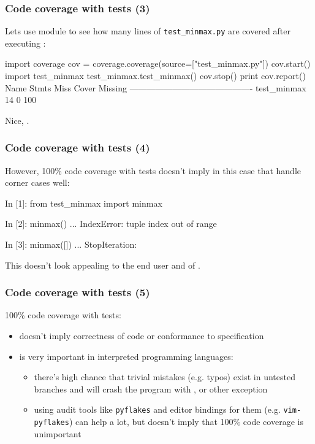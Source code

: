 \documentclass{beamer}
\begin{document}
\begin{frame}[fragile]
    \frametitle{Code coverage with tests (3)}

    Lets use  module to see how many lines of
    \verb+test_minmax.py+ are covered after executing :
    \begin{python}
import coverage
cov = coverage.coverage(source=["test_minmax.py"])
cov.start()
import test_minmax
test_minmax.test_minmax()
cov.stop()
print cov.report()
Name          Stmts   Miss  Cover   Missing
-------------------------------------------
test_minmax      14      0   100%
    \end{python}
    \pause
    Nice, .
\end{frame}

\begin{frame}[fragile]
    \frametitle{Code coverage with tests (4)}

    However, 100\% code coverage with tests doesn't imply in this case
    that  handle corner cases well:
    \begin{python}
In [1]: from test_minmax import minmax

In [2]: minmax()
...
IndexError: tuple index out of range

In [3]: minmax([])
...
StopIteration:
    \end{python}
    \pause
    This doesn't look appealing to the end user and  of .
\end{frame}

\begin{frame}[fragile]
    \frametitle{Code coverage with tests (5)}

    100\% code coverage with tests:
    \begin{itemize}
        \item doesn't imply correctness of code or conformance to specification
        \pause
        \item is very important in interpreted programming languages:
            \begin{itemize}
                \item there's high chance that trivial mistakes (e.g. typos) exist
                in untested branches and will crash the program with ,
                 or other exception
                \item using audit tools like \verb+pyflakes+ and editor bindings
                for them (e.g. \verb+vim-pyflakes+) can help a lot, but doesn't
                imply that 100\% code coverage is unimportant
            \end{itemize}
    \end{itemize}
\end{frame}
\end{document}
